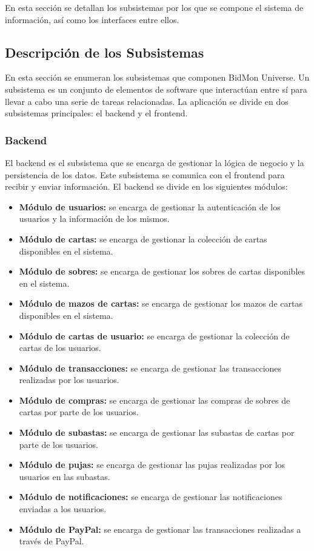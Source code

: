 En esta sección se detallan los subsistemas por los que se compone el sistema de información, así como los interfaces entre ellos.

\subsection{Descripción de los Subsistemas} 
En esta sección se enumeran los subsistemas que componen BidMon Universe.
Un subsistema es un conjunto de elementos de software que interactúan entre sí para llevar a cabo una serie de tareas relacionadas.
La aplicación se divide en dos subsistemas principales: el backend y el frontend.

\subsubsection{Backend}
El backend es el subsistema que se encarga de gestionar la lógica de negocio y la persistencia de los datos.
Este subsistema se comunica con el frontend para recibir y enviar información.
El backend se divide en los siguientes módulos:
\begin{itemize}
    \item \textbf{Módulo de usuarios:} se encarga de gestionar la autenticación de los usuarios y la información de los mismos.
    \item \textbf{Módulo de cartas:} se encarga de gestionar la colección de cartas disponibles en el sistema.
    \item \textbf{Módulo de sobres:} se encarga de gestionar los sobres de cartas disponibles en el sistema.
    \item \textbf{Módulo de mazos de cartas:} se encarga de gestionar los mazos de cartas disponibles en el sistema.
    \item \textbf{Módulo de cartas de usuario:} se encarga de gestionar la colección de cartas de los usuarios.
    \item \textbf{Módulo de transacciones:} se encarga de gestionar las transacciones realizadas por los usuarios.
    \item \textbf{Módulo de compras:} se encarga de gestionar las compras de sobres de cartas por parte de los usuarios.
    \item \textbf{Módulo de subastas:} se encarga de gestionar las subastas de cartas por parte de los usuarios.
    \item \textbf{Módulo de pujas:} se encarga de gestionar las pujas realizadas por los usuarios en las subastas.
    \item \textbf{Módulo de notificaciones:} se encarga de gestionar las notificaciones enviadas a los usuarios.
    \item \textbf{Módulo de PayPal:} se encarga de gestionar las transacciones realizadas a través de PayPal.
\end{itemize}

